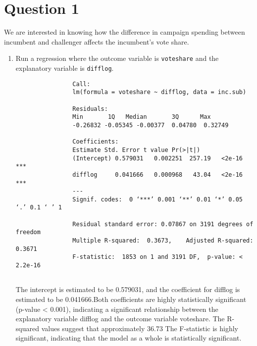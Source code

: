 \documentclass[12pt,letterpaper]{article}
\begin{document}
\section*{Question 1}
\vspace{.25cm}
\noindent We are interested in knowing how the difference in campaign spending between incumbent and challenger affects the incumbent's vote share. 
	\begin{enumerate}
		\item Run a regression where the outcome variable is \texttt{voteshare} and the explanatory variable is \texttt{difflog}.\\
		
		\vspace{.15cm}
		 
		\vspace{.15cm}
		
		\begin{footnotesize}
			
			\begin{verbatim}
				Call:
				lm(formula = voteshare ~ difflog, data = inc.sub)
				
				Residuals:
				Min       1Q   Median       3Q      Max 
				-0.26832 -0.05345 -0.00377  0.04780  0.32749 
				
				Coefficients:
				Estimate Std. Error t value Pr(>|t|)    
				(Intercept) 0.579031   0.002251  257.19   <2e-16 ***
				difflog     0.041666   0.000968   43.04   <2e-16 ***
				---
				Signif. codes:  0 ‘***’ 0.001 ‘**’ 0.01 ‘*’ 0.05 ‘.’ 0.1 ‘ ’ 1
				
				Residual standard error: 0.07867 on 3191 degrees of freedom
				Multiple R-squared:  0.3673,	Adjusted R-squared:  0.3671 
				F-statistic:  1853 on 1 and 3191 DF,  p-value: < 2.2e-16
				
			\end{verbatim}
		\end{footnotesize}
		
		\noindent The intercept is estimated to be 0.579031, and the coefficient for difflog is estimated to be 0.041666.Both coefficients are highly statistically significant (p-value < 0.001), indicating a significant relationship between the explanatory variable difflog and the outcome variable voteshare.
		The R-squared values suggest that approximately 36.73%
		The F-statistic is highly significant, indicating that the model as a whole is statistically significant.
		

\end{enumerate}
\end{document}
